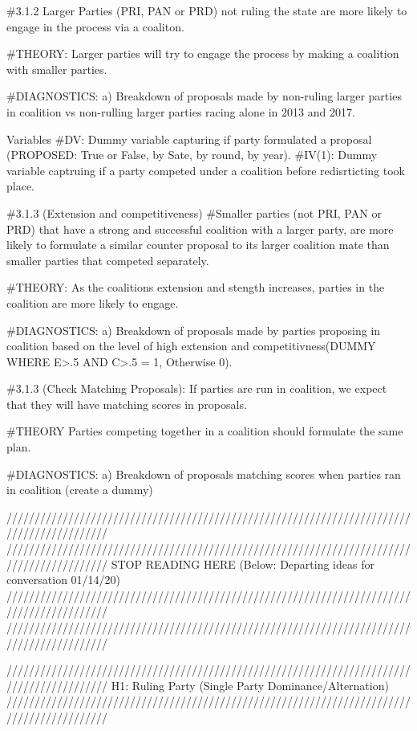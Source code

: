 \documentclass[]{article}
\begin{document}
\#3.1.2 Larger Parties (PRI, PAN or PRD) not ruling the state are more
likely to engage in the process via a coaliton.

\#THEORY: Larger parties will try to engage the process by making a
coalition with smaller parties.

\#DIAGNOSTICS: a) Breakdown of proposals made by non-ruling larger
parties in coalition vs non-rulling larger parties racing alone in 2013
and 2017.

Variables \#DV: Dummy variable capturing if party formulated a proposal
(PROPOSED: True or False, by Sate, by round, by year). \#IV(1): Dummy
variable captruing if a party competed under a coalition before
redisrticting took place.

\#3.1.3 (Extension and competitiveness) \#Smaller parties (not PRI, PAN
or PRD) that have a strong and successful coalition with a larger party,
are more likely to formulate a similar counter proposal to its larger
coalition mate than smaller parties that competed separately.

\#THEORY: As the coalitions extension and stength increases, parties in
the coalition are more likely to engage.

\#DIAGNOSTICS: a) Breakdown of proposals made by parties proposing in
coalition based on the level of high extension and competitivness(DUMMY
WHERE E\textgreater{}.5 AND C\textgreater{}.5 = 1, Otherwise 0).

\#3.1.3 (Check Matching Proposals): If parties are run in coalition, we
expect that they will have matching scores in proposals.

\#THEORY Parties competing together in a coalition should formulate the
same plan.

\#DIAGNOSTICS: a) Breakdown of proposals matching scores when parties
ran in coalition (create a dummy)

//////////////////////////////////////////////////////////////////////////////////////////
//////////////////////////////////////////////////////////////////////////////////////////
STOP READING HERE (Below: Departing ideas for conversation 01/14/20)
//////////////////////////////////////////////////////////////////////////////////////////
//////////////////////////////////////////////////////////////////////////////////////////

//////////////////////////////////////////////////////////////////////////////////////////
H1: Ruling Party (Single Party Dominance/Alternation)
//////////////////////////////////////////////////////////////////////////////////////////
\end{document}
